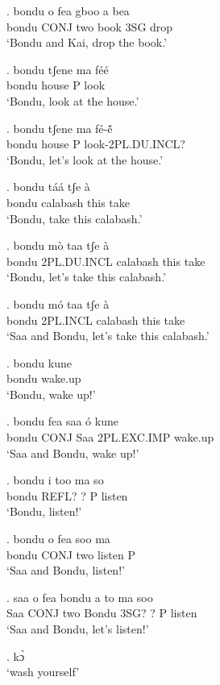 \documentclass{assets/fieldnotes}
\begin{document}
{\exg. bondu o fea gboo a bea \\
bondu CONJ two book 3SG drop \\
`Bondu and Kai, drop the book.'

\exg. bondu tʃene ma féé \\
bondu house P look \\
`Bondu, look at the house.'

\exg. bondu tʃene ma fé-ẽ́\\
bondu house P look-2PL.DU.INCL? \\
`Bondu, let's look at the house.'

\exg. bondu táá tʃe à \\
bondu calabash this take \\
`Bondu, take this calabash.'

\exg. bondu mò taa tʃe à \\
bondu 2PL.DU.INCL  calabash this take \\
`Bondu, let's take this calabash.'

\exg. bondu mó taa tʃe à \\
bondu 2PL.INCL calabash this take \\
`Saa and Bondu, let's take this calabash.'


 

\exg. bondu kune \\
bondu wake.up \\
`Bondu, wake up!'

\exg. bondu fea saa ó kune \\
bondu CONJ Saa 2PL.EXC.IMP wake.up \\
`Saa and Bondu, wake up!'

\exg. bondu i too ma so \\
bondu REFL? ? P listen \\
`Bondu, listen!'

\exg. bondu o fea soo ma \\
bondu CONJ two listen P \\
`Saa and Bondu, listen!'

\exg. saa o fea bondu a to ma soo \\
Saa CONJ two Bondu 3SG? ? P listen \\
`Saa and Bondu, let's listen!'


\ex. kɔ̀ \\
`wash yourself'

}
\end{document}
